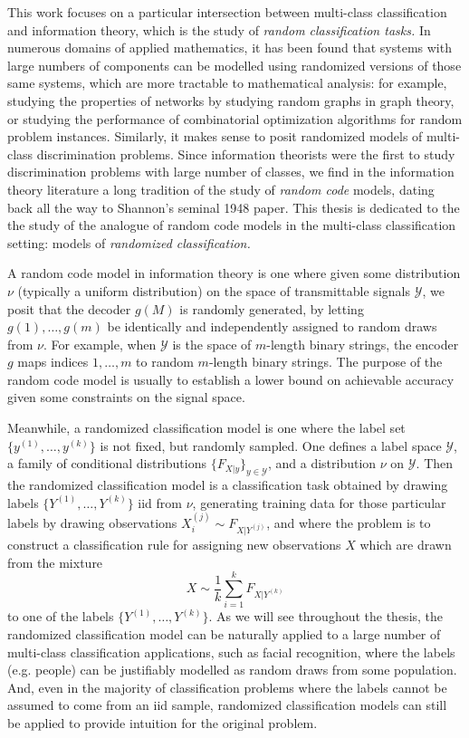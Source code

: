 This work focuses on a particular intersection between multi-class
classification and information theory, which is the study of
\emph{random classification tasks.}  In numerous domains of applied
mathematics, it has been found that systems with large numbers of
components can be modelled using randomized versions of those same
systems, which are more tractable to mathematical analysis: for
example, studying the properties of networks by studying random graphs
in graph theory, or studying the performance of combinatorial
optimization algorithms for random problem instances.  Similarly, it
makes sense to posit randomized models of multi-class discrimination
problems.  Since information theorists were the first to study
discrimination problems with large number of classes, we find in the
information theory literature a long tradition of the study of
\emph{random code} models, dating back all the way to Shannon's
seminal 1948 paper.  This thesis is dedicated to the the study of the
analogue of random code models in the multi-class classification
setting: models of \emph{randomized classification.}  

A random code model in information theory is one where given some
distribution $\nu$ (typically a uniform distribution) on the space of
transmittable signals $\mathcal{Y}$, we posit that the decoder $g(M)$
is randomly generated, by letting $g(1),\hdots, g(m)$ be identically
and independently assigned to random draws from $\nu$.  For example,
when $\mathcal{Y}$ is the space of $m$-length binary strings, the
encoder $g$ maps indices $1, \hdots, m$ to random $m$-length binary
strings.  The purpose of the random code model is usually to establish
a lower bound on achievable accuracy given some constraints on the
signal space.

Meanwhile, a randomized classification model is one where the label
set $\{y^{(1)},\hdots, y^{(k)}\}$ is not fixed, but randomly sampled.
One defines a label space $\mathcal{Y}$, a family of conditional
distributions $\{F_{X|y}\}_{y \in \mathcal{Y}}$, and a distribution
$\nu$ on $\mathcal{Y}$.  Then the randomized classification model is a
classification task obtained by drawing labels $\{Y^{(1)},\hdots,
Y^{(k)}\}$ iid from $\nu$, generating training data for those
particular labels by drawing observations $X_i^{(j)} \sim
F_{X|Y^{(j)}}$, and where the problem is to construct a classification
rule for assigning new observations $X$ which are drawn from the
mixture
\[
X \sim \frac{1}{k}\sum_{i=1}^k F_{X|Y^{(k)}}
\]
to one of the labels $\{Y^{(1)},\hdots, Y^{(k)}\}.$ As we will see
throughout the thesis, the randomized classification model can be
naturally applied to a large number of multi-class classification
applications, such as facial recognition, where the labels
(e.g. people) can be justifiably modelled as random draws from some
population.  And, even in the majority of classification problems
where the labels cannot be assumed to come from an iid sample,
randomized classification models can still be applied to provide
intuition for the original problem.

